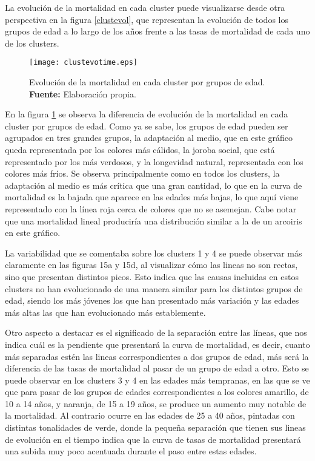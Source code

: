 \documentclass{article}
\begin{document}
\vspace{0.3cm}

La evolución de la mortalidad en cada cluster puede visualizarse desde otra perspectiva en la figura \ref{clustevol}, que representan la evolución de todos los grupos de edad a lo largo de los años frente a las tasas de mortalidad de cada uno de los clusters. 

\begin{figure}[H]
\centering
\texttt{[image: clustevotime.eps]}
\caption{\centering Evolución de la mortalidad en cada cluster por grupos de edad. \\ \textbf{Fuente:} Elaboración propia.}
\label{clustevotime}
\end{figure}

En la figura  \ref{clustevotime} se observa la diferencia de evolución de la mortalidad en cada cluster por grupos de edad. Como ya se sabe, los grupos de edad pueden ser agrupados en tres grandes grupos, la adaptación al medio, que en este gráfico queda representada por los colores más cálidos, la joroba social, que está representado por los más verdosos, y la longevidad natural, representada con los colores más fríos. Se observa principalmente como en todos los clusters, la adaptación al medio es más crítica que una gran cantidad, lo que en la curva de mortalidad es la bajada que aparece en las edades más bajas, lo que aquí viene representado con la línea roja cerca de colores que no se asemejan. Cabe notar que una mortalidad lineal produciría una distribución similar a la de un arcoiris en este gráfico.

La variabilidad que se comentaba sobre los clusters 1 y 4 se puede observar más claramente en las figuras 15a y 15d, al visualizar cómo las lineas no son rectas, sino que presentan distintos picos. Esto indica que las causas incluidas en estos clusters no han evolucionado de una manera similar para los distintos grupos de edad, siendo los más jóvenes los que han presentado más variación y las edades más altas las que han evolucionado más establemente.

Otro aspecto a destacar es el significado de la separación entre las líneas, que nos indica cuál es la pendiente que presentará la curva de mortalidad, es decir, cuanto más separadas estén las lineas correspondientes a dos grupos de edad, más será la diferencia de las tasas de mortalidad al pasar de un grupo de edad a otro. Esto se puede observar en los clusters 3 y 4 en las edades más tempranas, en las que se ve que para pasar de los grupos de edades correspondientes a los colores amarillo, de 10 a 14 años, y naranja, de 15 a 19 años, se produce un aumento muy notable de la mortalidad. Al contrario ocurre en las edades de 25 a 40 años, pintadas con distintas tonalidades de verde, donde la pequeña separación que tienen sus lineas de evolución en el tiempo indica que la curva de tasas de mortalidad presentará una subida muy poco acentuada durante el paso entre estas edades.
\end{document}
